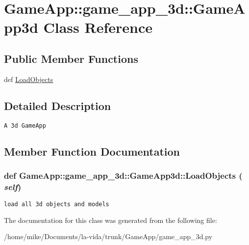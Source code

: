 \hypertarget{classGameApp_1_1game__app__3d_1_1GameApp3d}{
\section{GameApp::game\_\-app\_\-3d::GameApp3d Class Reference}
\label{classGameApp_1_1game__app__3d_1_1GameApp3d}
}
\subsection*{Public Member Functions}
\begin{CompactItemize}
\item 
def \hyperlink{classGameApp_1_1game__app__3d_1_1GameApp3d_f69784b2483035a6c00d8adc5057d8b2}{LoadObjects}
\end{CompactItemize}


\subsection{Detailed Description}


\footnotesize\begin{verbatim}A 3d GameApp\end{verbatim}
\normalsize
 

\subsection{Member Function Documentation}
\hypertarget{classGameApp_1_1game__app__3d_1_1GameApp3d_f69784b2483035a6c00d8adc5057d8b2}{
\subsubsection[LoadObjects]{\setlength{\rightskip}{0pt plus 5cm}def GameApp::game\_\-app\_\-3d::GameApp3d::LoadObjects ( {\em self})}}
\label{classGameApp_1_1game__app__3d_1_1GameApp3d_f69784b2483035a6c00d8adc5057d8b2}




\footnotesize\begin{verbatim}load all 3d objects and models\end{verbatim}
\normalsize
 

The documentation for this class was generated from the following file:\begin{CompactItemize}
\item 
/home/mike/Documents/la-vida/trunk/GameApp/game\_\-app\_\-3d.py\end{CompactItemize}
